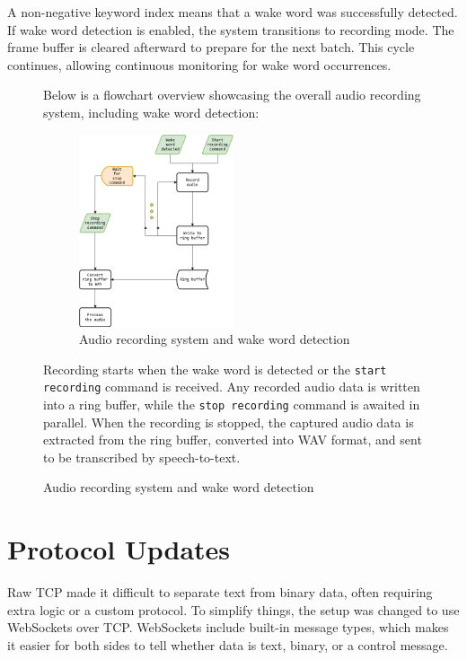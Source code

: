 A non-negative keyword index means that a wake word was successfully detected.
If wake word detection is enabled, the system transitions to recording mode.
The frame buffer is cleared afterward to prepare for the next batch.
This cycle continues, allowing continuous monitoring for wake word occurrences.
\newline
\begin{figure}[H]
    Below is a flowchart overview showcasing the overall audio recording system, including wake word detection:

    \begin{figure}[H]
        \centering
        \includegraphics[width=0.5\textwidth]{assets/wakeword.png}
        \caption{Audio recording system and wake word detection}
    \end{figure}
    
    Recording starts when the wake word is detected or the \texttt{start recording} command is received.
    Any recorded audio data is written into a ring buffer, while the \texttt{stop recording} command is awaited in parallel.  
    When the recording is stopped, the captured audio data is extracted from the ring buffer,
    converted into WAV format, and sent to be transcribed by speech-to-text.
\end{figure}

\section{Protocol Updates}
Raw TCP made it difficult to separate text from binary data, often requiring extra logic or a custom protocol.
To simplify things, the setup was changed to use WebSockets over TCP.
WebSockets include built-in message types, which makes it easier for both sides to tell whether data is text, binary, or a control message.

